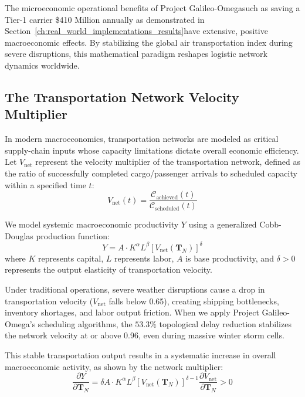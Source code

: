 \documentclass[11pt,a4paper]{book}
\begin{document}
The microeconomic operational benefits of Project Galileo-Omegasuch as saving a Tier-1 carrier \$410 Million annually as demonstrated in Section~\ref{ch:real_world_implementations_results}have extensive, positive macroeconomic effects. By stabilizing the global air transportation index during severe disruptions, this mathematical paradigm reshapes logistic network dynamics worldwide.

\subsection{The Transportation Network Velocity Multiplier}

In modern macroeconomics, transportation networks are modeled as critical supply-chain inputs whose capacity limitations dictate overall economic efficiency. Let $V_{\text{net}}$ represent the velocity multiplier of the transportation network, defined as the ratio of successfully completed cargo/passenger arrivals to scheduled capacity within a specified time $t$:
\begin{equation}
\label{eq:network_velocity}
V_{\text{net}}(t) = \frac{\mathcal{C}_{\text{achieved}}(t)}{\mathcal{C}_{\text{scheduled}}(t)}
\end{equation}

We model systemic macroeconomic productivity $Y$ using a generalized Cobb-Douglas production function:
\begin{equation}
\label{eq:cobb_douglas}
Y = A \cdot K^\alpha L^\beta \left[ V_{\text{net}}(\mathbf{T}_N) \right] ^\delta
\end{equation}
where $K$ represents capital, $L$ represents labor, $A$ is base productivity, and $\delta > 0$ represents the output elasticity of transportation velocity.

Under traditional operations, severe weather disruptions cause a drop in transportation velocity ($V_{\text{net}}$ falls below 0.65), creating shipping bottlenecks, inventory shortages, and labor output friction. When we apply Project Galileo-Omega's scheduling algorithms, the $53.3\%$ topological delay reduction stabilizes the network velocity at or above 0.96, even during massive winter storm cells. 

This stable transportation output results in a systematic increase in overall macroeconomic activity, as shown by the network multiplier:
\begin{equation}
\label{eq:multiplier_differential}
\frac{\partial Y}{\partial \mathbf{T}_N} = \delta A \cdot K^\alpha L^\beta \left[ V_{\text{net}}(\mathbf{T}_N) \right] ^{\delta - 1} \frac{\partial V_{\text{net}}}{\partial \mathbf{T}_N} > 0
\end{equation}
\end{document}
